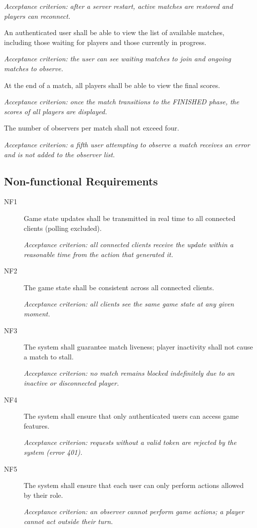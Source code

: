 \documentclass{scrartcl}
\begin{document}
\begin{description}
  \textit{Acceptance criterion: after a server restart, active matches are restored and players can reconnect.}

  \item[F17] An authenticated user shall be able to view the list of available matches, including those waiting for players and those currently in progress.

  \textit{Acceptance criterion: the user can see waiting matches to join and ongoing matches to observe.}

  \item[F18] At the end of a match, all players shall be able to view the final scores.

  \textit{Acceptance criterion: once the match transitions to the FINISHED phase, the scores of all players are displayed.}

  \item[F19] The number of observers per match shall not exceed four.

  \textit{Acceptance criterion: a fifth user attempting to observe a match receives an error and is not added to the observer list.}

\end{description}

\subsection{Non-functional Requirements}

\begin{description}
  \item[NF1] Game state updates shall be transmitted in real time to all connected clients (polling excluded).

  \textit{Acceptance criterion: all connected clients receive the update within a reasonable time from the action that generated it.}

  \item[NF2] The game state shall be consistent across all connected clients.

  \textit{Acceptance criterion: all clients see the same game state at any given moment.}

  \item[NF3] The system shall guarantee match liveness; player inactivity shall not cause a match to stall.

  \textit{Acceptance criterion: no match remains blocked indefinitely due to an inactive or disconnected player.}

  \item[NF4] The system shall ensure that only authenticated users can access game features.

  \textit{Acceptance criterion: requests without a valid token are rejected by the system (error 401).}

  \item[NF5] The system shall ensure that each user can only perform actions allowed by their role.

  \textit{Acceptance criterion: an observer cannot perform game actions; a player cannot act outside their turn.}

\end{description}
\end{document}
